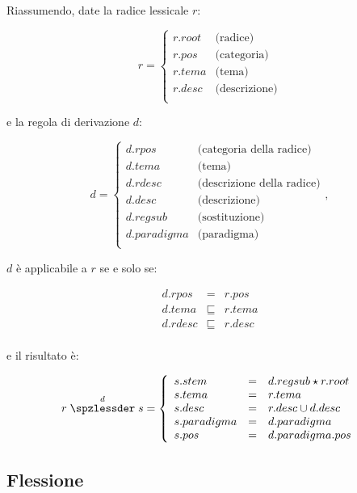 \documentclass[twoside,stylearticle,11pt,filologia,it,article,bibsection]{spinoza}
\newcommand\spzmsussunto{\sqsubseteq}
\newcommand\spzmunify{\cup}
\newcommand\spzmregsub{\star}
\newenvironment{lingmeq}{\begin{lingeq}\[}{\]\end{lingeq}}
\begin{document}
Riassumendo, date la radice lessicale $r$:
\begin{lingmeq}
r=\left\{\begin{array}{lr}
r.{root} & \text{(radice)}\\
r.{pos} & \text{(categoria)}\\
r.tema & \text{(tema)}\\
r.desc & \text{(descrizione)}\\
\end{array}\right.
\end{lingmeq}
\noindent e la regola di derivazione $d$:
\begin{lingmeq}
d=\left\{\begin{array}{lr}
d.{rpos} & \text{(categoria della radice)}\\
d.tema & \text{(tema)}\\
d.{rdesc} & \text{(descrizione della radice)}\\
d.desc & \text{(descrizione)}\\
d.{regsub} & \text{(sostituzione)}\\
d.paradigma & \text{(paradigma)}\\
\end{array}\right.,
\end{lingmeq}
\noindent $d$ è applicabile a $r$ se e solo se:
\begin{lingmeq}
\begin{array}{rcl}
d.{rpos}&=&r.{pos}\\
d.tema&\spzmsussunto&r.tema\\
d.{rdesc}&\spzmsussunto&r.desc\\
\end{array}
\end{lingmeq}
\noindent e il risultato è:
\begin{lingmeq}
r \stackrel{d}{\spzlessder} s = \left\{
\begin{array}{lll}
s.stem &=& d.regsub \spzmregsub r.root\\
s.tema &=& r.tema \\
s.desc &=& r.desc \spzmunify d.desc \\
s.paradigma &=& d.paradigma \\
s.pos &=& d.paradigma.pos \\
\end{array}
\right.
\end{lingmeq}

\subsection{Flessione}
\end{document}

